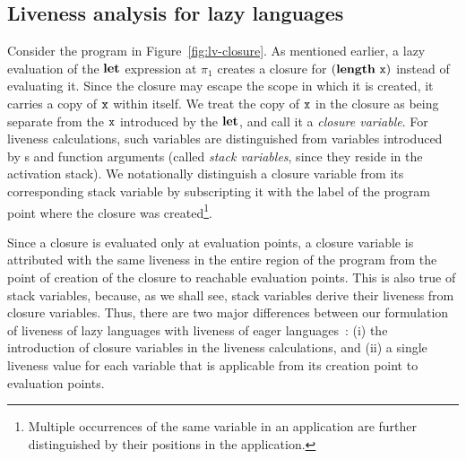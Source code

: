 \documentclass[9pt,nonatbib]{sigplanconf}
\begin{document}
\renewcommand{\pp}[2]{\ensuremath{#1\!\!:\!#2}} %

\subsection{Liveness analysis for lazy languages}
\label{sec:liveness-analysis}


Consider the program in Figure~\ref{fig:lv-closure}.  As mentioned
earlier, a lazy evaluation of the $\mbox{$\mathbf{ let}$}$ expression at $\pi_1$ creates
a closure for $(\mathbf{length}~\mbox{\tt x})$ instead of evaluating it.  Since the
closure may escape the scope in which it is created, it carries a copy
of $\mbox{\tt x}$ within itself.  We treat the copy of $\mbox{\tt x}$ in the closure as
being separate from the $\mbox{\tt x}$ introduced by the $\mbox{$\mathbf{ let}$}$, and call it a
\emph{closure variable}.  For liveness calculations, such variables
are distinguished from variables introduced by \LET s and function
arguments (called \emph{stack variables}, since they reside in the
activation stack).  We notationally distinguish a closure variable
from its corresponding stack variable by subscripting it with the
label of the program point where the closure was
created\footnote{Multiple occurrences of the same variable in an
  application are further distinguished by their positions in the
  application.}.


  Since a  closure is evaluated  only at evaluation points,  a closure
  variable is attributed  with the same liveness in  the entire region
  of  the  program from  the  point  of  creation  of the  closure  to
  reachable evaluation points.  This is  also true of stack variables,
  because, as we shall see, stack variables derive their liveness from
  closure variables. Thus, there are two major differences between our
  formulation of  liveness of  lazy languages  with liveness  of eager
  languages~\cite{asati14lgc}:   (i)  the   introduction  of   closure
  variables in the  liveness calculations, and (ii)  a single liveness
  value for each  variable that is applicable from  its creation point
  to evaluation points.
\end{document}
